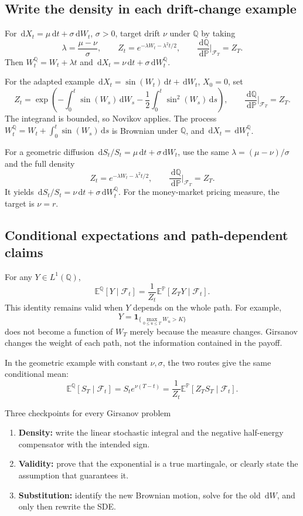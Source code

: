 \documentclass[10pt]{article}
\newcommand{\E}{\mathbb E}
\newcommand{\Pp}{\mathbb P}
\newcommand{\Q}{\mathbb Q}
\newcommand{\1}{\mathbf 1}
\newcommand{\cF}{\mathcal F}
\newcommand{\dd}{\,\mathrm d}
\theoremstyle{definition}
\begin{document}
\subsection{Write the density in each drift-change example}

For \(\dd X_t=\mu\dd t+\sigma\dd W_t\), \(\sigma>0\), target drift
\(\nu\) under \(\Q\) by taking
\[
\lambda=\frac{\mu-\nu}{\sigma},\qquad
Z_t=e^{-\lambda W_t-\lambda^2t/2},\qquad
\frac{\dd\Q}{\dd\Pp}\bigg|_{\cF_T}=Z_T.
\]
Then \(W_t^{\Q}=W_t+\lambda t\) and
\(\dd X_t=\nu\dd t+\sigma\dd W_t^{\Q}\).

For the adapted example
\(\dd X_t=\sin(W_t)\dd t+\dd W_t\), \(X_0=0\), set
\[
Z_t=\exp\!\left(-\int_0^t\sin(W_s)\dd W_s
-\frac12\int_0^t\sin^2(W_s)\dd s\right),\qquad
\frac{\dd\Q}{\dd\Pp}\bigg|_{\cF_T}=Z_T.
\]
The integrand is bounded, so Novikov applies. The process
\(W_t^{\Q}=W_t+\int_0^t\sin(W_s)\dd s\) is Brownian under \(\Q\), and
\(\dd X_t=\dd W_t^{\Q}\).

For a geometric diffusion \(\dd S_t/S_t=\mu\dd t+\sigma\dd W_t\), use the
same \(\lambda=(\mu-\nu)/\sigma\) and the full density
\[
Z_t=e^{-\lambda W_t-\lambda^2t/2},\qquad
\frac{\dd\Q}{\dd\Pp}\bigg|_{\cF_T}=Z_T.
\]
It yields \(\dd S_t/S_t=\nu\dd t+\sigma\dd W_t^{\Q}\). For the
money-market pricing measure, the target is \(\nu=r\).

\subsection{Conditional expectations and path-dependent claims}

For any \(Y\in L^1(\Q)\),
\[
\E^{\Q}[Y\mid\cF_t]
=\frac1{Z_t}\E^{\Pp}[Z_TY\mid\cF_t].
\]
This identity remains valid when \(Y\) depends on the whole path. For example,
\[
Y=\1_{\{\max_{0\leq u\leq T}W_u>K\}}
\]
does not become a function of \(W_T\) merely because the measure changes.
Girsanov changes the weight of each path, not the information contained in
the payoff.

In the geometric example with constant \(\nu,\sigma\), the two routes give
the same conditional mean:
\[
\boxed{\E^{\Q}[S_T\mid\cF_t]
=S_te^{\nu(T-t)}
=\frac1{Z_t}\E^{\Pp}[Z_TS_T\mid\cF_t].}
\]

\begin{keyidea}{Three checkpoints for every Girsanov problem}
\begin{enumerate}
  \item \textbf{Density:} write the linear stochastic integral and the
        negative half-energy compensator with the intended sign.
  \item \textbf{Validity:} prove that the exponential is a true martingale,
        or clearly state the assumption that guarantees it.
  \item \textbf{Substitution:} identify the new Brownian motion, solve for
        the old \(\dd W\), and only then rewrite the SDE.
\end{enumerate}
\end{keyidea}
\end{document}
